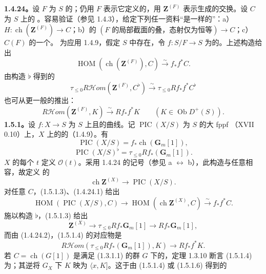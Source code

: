 \textbf{1.4.24。}设 $F$ 为 $S$ 的；仍用 $F$ 表示它定义的，用 $\mathbf Z^{(F)}$ 表示生成的交换。设 $C$ 为 $S$ 上的 。容易验证（参见 1.4.3），给定下列任一资料“是一样的”：a） $H:\operatorname{ch}(\mathbf Z^{(F)})\to C$；b）的 $(F\text{ 的局部截面的叠，态射仅为恒等})\to C$；c）$C(F)$ 的一个。
为应用 1.4.9，假定 $S$ 中存在，令 $f:S/F\to S$ 为的。上述构造给出
\[\operatorname{HOM}(\operatorname{ch}(\mathbf Z^{(F)}),C)\xrightarrow\sim f_*f^*C.\tag{1.4.24.1}\]
由构造 $\flat$ 得到的
\[\tau_{\le0}R\mathcal Hom(\mathbf Z^{(F)},C^\flat)\xrightarrow\sim\tau_{\le0}Rf_*f^*C^\flat\]
也可从更一般的推出：
\[R\mathcal Hom(\mathbf Z^{(F)},K)\xrightarrow\sim Rf_*f^*K\qquad(K\in\operatorname{Ob}D^+(S)).\tag{1.4.24.2}\]
\textbf{1.5.1。}设 $f:X\to S$ 为 $S$ 上且的曲线。记 $\operatorname{PIC}(X/S)$ 为 $S$ 的大 fppf （XVII 0.10）上，$X$ 上的的（1.4.9）。有
\[\operatorname{PIC}(X/S)=f_*\operatorname{ch}(\mathbf G_m[1]),\tag{1.5.1.1}\]
\[\operatorname{PIC}(X/S)^\flat=\tau_{\le0}Rf_*(\mathbf G_m[1]).\tag{1.5.1.2}\]
$X$ 的每个 $t$ 定义 $\mathcal O(t)$。采用 1.4.24 的记号（参见 a $\leftrightarrow$ b），此构造与任意相容，故定义 的
\[\operatorname{ch}\mathbf Z^{(X)}\to\operatorname{PIC}(X/S).\tag{1.5.1.3}\]
对任意  $C$，(1.5.1.3)、(1.4.24.1) 给出
\[\operatorname{HOM}(\operatorname{PIC}(X/S),C)\to\operatorname{HOM}(\operatorname{ch}\mathbf Z^{(X)},C)\xrightarrow\sim f_*f^*C.\tag{1.5.1.4}\]
施以构造 $\flat$，(1.5.1.3) 给出
\[\mathbf Z^{(X)}\to\tau_{\le0}Rf_*\mathbf G_m[1]\to Rf_*\mathbf G_m[1],\tag{1.5.1.5}\]
而由 (1.4.24.2)，(1.5.1.4) 的对应物是
\[R\mathcal Hom(\tau_{\le0}Rf_*(\mathbf G_m[1]),K)\to Rf_*f^*K.\tag{1.5.1.6}\]
若 $C=\operatorname{ch}(G[1])$ 是满足 (1.3.1.1) 的群 $G$ 下的，定理 1.3.10 断言 (1.5.1.4) 为；其逆将 $G_X$ 下 $K$ 映为 $\langle x,K]$。这于由 (1.5.1.4) 或 (1.5.1.6) 得到的

